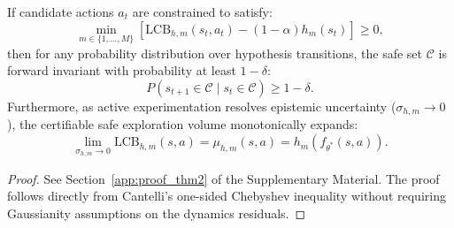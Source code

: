 \begin{theorem}
\label{thm:safe_exploration}
If candidate actions $a_t$ are constrained to satisfy:
\begin{equation}
    \min_{m \in \{1,\dots,M\}} \left[ \text{LCB}_{h, m}(s_t, a_t) - (1 - \alpha) h_m(s_t) \right] \ge 0,
\end{equation}
then for any probability distribution over hypothesis transitions, the safe set $\mathcal{C}$ is forward invariant with probability at least $1 - \delta$:
\begin{equation}
    P\left( s_{t+1} \in \mathcal{C} \;\big|\; s_t \in \mathcal{C} \right) \ge 1 - \delta.
\end{equation}
Furthermore, as active experimentation resolves epistemic uncertainty ($\sigma_{h, m} \to 0$), the certifiable safe exploration volume monotonically expands:
\begin{equation}
    \lim_{\sigma_{h, m} \to 0} \text{LCB}_{h, m}(s, a) = \mu_{h, m}(s, a) = h_m(f_{\theta^*}(s, a)).
\end{equation}
\end{theorem}

\begin{proof}
See Section~\ref{app:proof_thm2} of the Supplementary Material. The proof follows directly from Cantelli's one-sided Chebyshev inequality without requiring Gaussianity assumptions on the dynamics residuals.
\end{proof}
